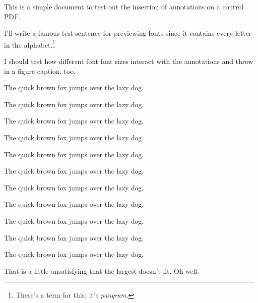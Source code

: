 \documentclass{amsart}
\begin{document}
This is a simple document to test out the insertion of annotations on a control PDF.

I'll write a famous test sentence for previewing fonts since it contains every letter in the alphabet.\footnote{There's a term for this: it's \textit{pangram}.}

I should test how different font font sizes interact with the annotations and throw in a figure caption, too.




{\larger[5] The quick brown fox jumps over the lazy dog.}

{\larger[4] The quick brown fox jumps over the lazy dog.}

{\larger[3] The quick brown fox jumps over the lazy dog.}

{\larger[2] The quick brown fox jumps over the lazy dog.}

{\larger[1] The quick brown fox jumps over the lazy dog.}

{\smaller[0] The quick brown fox jumps over the lazy dog.}

{\smaller[1] The quick brown fox jumps over the lazy dog.}

{\smaller[2] The quick brown fox jumps over the lazy dog.}

{\smaller[3] The quick brown fox jumps over the lazy dog.}

{\smaller[4] The quick brown fox jumps over the lazy dog.}

{\smaller[5] The quick brown fox jumps over the lazy dog.}

That is a little unsatisfying that the largest {\tt \string\larger} doesn't fit. Oh well.
\end{document}
